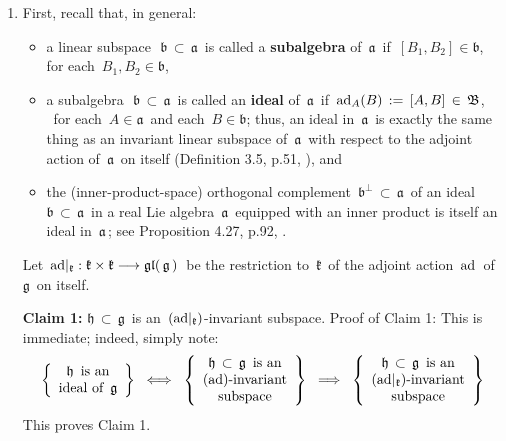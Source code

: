 \begin{enumerate}
\item
    First, recall that, in general:
    \begin{itemize}
    \item
        a linear subspace \,$\,\mathfrak{b} \,\subset\,\mathfrak{a}$\,
        is called a \textbf{subalgebra} of \,$\mathfrak{a}$\, if
        \,$[B_{1},B_{2}] \in \mathfrak{b}$,\, for each \,$B_{1}, B_{2} \in \mathfrak{b}$,
    \item
        a subalgebra \,$\,\mathfrak{b} \,\subset\,\mathfrak{a}$\,
        is called an \textbf{ideal} of \,$\mathfrak{a}$\, if
        \,$\textnormal{ad}_{A}(B) \,:=\, [A,B] \,\in\, \mathfrak{B}$,\, \
        for each \,$A \in \mathfrak{a}$\, and each \,$B \in \mathfrak{b}$;
        thus, an ideal in \,$\mathfrak{a}$\, is exactly the same thing
        as an invariant linear subspace of \,$\mathfrak{a}$\,
        with respect to the adjoint action of \,$\mathfrak{a}$\, on itself
        (Definition 3.5, p.51, \cite{Hall2015}), and
    \item
        the (inner-product-space) orthogonal complement
        \,$\mathfrak{b}^{\perp} \,\subset\, \mathfrak{a}$\,
        of an ideal
        \,$\mathfrak{b} \,\subset\, \mathfrak{a}$\,
        in a real Lie algebra \,$\mathfrak{a}$\, equipped with an inner product
        is itself an ideal in \,$\mathfrak{a}$\,;
        see Proposition 4.27, p.92, \cite{Hall2015}.
    \end{itemize}
    \vskip 0.3cm
    \noindent
    Let
    \,$\textnormal{ad}\vert_{\mathfrak{k}} : \mathfrak{k} \times \mathfrak{k} \longrightarrow \mathfrak{gl}(\,\mathfrak{g}\,)$\,
    be the restriction to \,$\mathfrak{k}$\, of the adjoint action \,$\textnormal{ad}$\, of \,$\mathfrak{g}$\, on itself.

    \vskip 0.3cm
    \noindent
    \textbf{Claim 1:}\;\;
    $\mathfrak{h} \,\subset\, \mathfrak{g}$\, is an \,$(\textnormal{ad}\vert_{\mathfrak{k}})$-invariant subspace.
    \vskip 0.05cm
    Proof of Claim 1:\;\; This is immediate; indeed, simply note:
    \begin{equation*}
    \left\{\begin{array}{c}
        \textnormal{$\mathfrak{h}$\, is an}
        \\
        \textnormal{ideal of \,$\mathfrak{g}$}
        \end{array}\right\}
    \;\;\Longleftrightarrow\;\;
    \left\{\begin{array}{c}
        \textnormal{$\mathfrak{h} \,\subset\, \mathfrak{g}$\, is an}
        \\
        \textnormal{$(\textnormal{ad})$-invariant}
        \\
        \textnormal{subspace}
        \end{array}\right\}
    \;\;\Longrightarrow\;\;
    \left\{\begin{array}{c}
        \textnormal{$\mathfrak{h} \,\subset\, \mathfrak{g}$\, is an}
        \\
        \textnormal{$(\textnormal{ad}\vert_{\mathfrak{k}})$-invariant}
        \\
        \textnormal{subspace}
        \end{array}\right\}
    \end{equation*}
    This proves Claim 1.


\end{enumerate}
